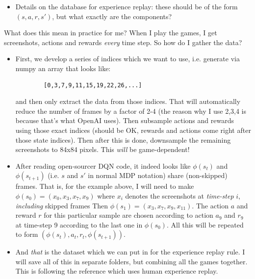 \documentclass[letterpaper, 10pt, conference]{ieeeconf}
\begin{document}
\begin{itemize}
        \item Details on the database for experience replay: these should be of
        the form $(s,a,r,s')$, but what exactly are the components?
    \end{itemize}

    What does this mean in practice for me? When I play the games, I get
    screenshots, actions and rewards \emph{every} time step. So how do I gather
    the data?

\begin{itemize}
        \item First, we develop a series of indices which we want to use, i.e.
        generate via numpy an array that looks like:
        \begin{verbatim}
        [0,3,7,9,11,15,19,22,26,...]
        \end{verbatim}
        and then only extract the data from those indices. That will
        automatically reduce the number of frames by a factor of 2-4 (the reason
        why I use 2,3,4 is because that's what OpenAI uses). Then subsample
        actions and rewards using those exact indices (should be OK, rewards and
        actions come right after those state indices). Then after this is done,
        downsample the remaining screenshots to 84x84 pixels. This \emph{will}
        be game-dependent!

        \item After reading open-sourcer DQN code, it indeed looks like
        $\phi(s_t)$ and $\phi(s_{t+1})$ (i.e. $s$ and $s'$ in normal MDP
        notation) share (non-skipped) frames. That is, for the example above, I
        will need to make $\phi(s_0) = (x_0,x_3,x_7,x_9)$ where $x_i$ denotes
        the screenshots at \emph{time-step} $i$, \emph{including} skipped frames
        Then $\phi(s_1) = (x_3,x_7,x_9,x_{11})$. The action $a$ and reward $r$
        for this particular sample are chosen according to action $a_9$ and
        $r_9$ at time-step 9 according to the last one in $\phi(s_0)$. All this
        will be repeated to form $(\phi(s_t),a_t,r_t,\phi(s_{t+1}))$.

        \item And \emph{that} is the dataset which we can put in for the
        experience replay rule. I will save all of this in separate folders, but
        combining all the games together. This is following the reference which
        uses human experience replay.


\end{itemize}
\end{document}
